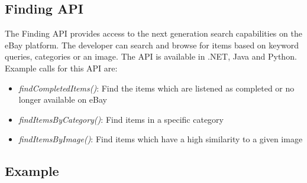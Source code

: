 \subsection{Finding API}
The Finding API provides access to the next generation search capabilities on the eBay platform. The developer can search and browse for items based on keyword queries, categories or an image. The API is available in .NET, Java and Python. Example calls for this API are:
\begin{itemize}
	\item \textit{findCompletedItems()}: Find the items which are listened as completed or no longer available on eBay
	\item \textit{findItemsByCategory()}: Find items in a specific category
	\item \textit{findItemsByImage()}: Find items which have a high similarity to a given image
\end{itemize}

\subsection{Example}
